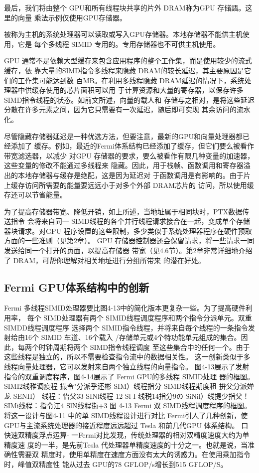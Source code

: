 最后，我们将由整个 GPU和所有线程块共享的片外 DRAM称为GPU 存储語。这里的向量
乘法示例仅使用GPU存储器。

被称为主机的系统处理器可以读取或写入GPU存储器。本地存储器不能供主机使用，它是
每个多线程 SIMID 专用的。专用存储器也不可供主机使用。

GPU 通常不是依赖大型缓存来包含应用程序的整个工作集，而是使用较少的流式缓存，依
靠大量的SIMD指令多线程来隐藏 DRAM的较长延迟，其主要原因是它们的工作集可能达到数
百MB。在利用多线程隐藏 DRAM延迟的情况下，系统处理器中供缓存使用的芯片面积可以用
于计算资源和大量的寄存器，以保存许多SIMD指令线程的状态。如前文所述，向量的载人和
存储与之相对，是将这些延迟分散在许多元素之间，因为它只需要有一次延迟，随后即可实现
其余访问的流水化。

尽管隐藏存储器延迟是一种优选方法，但要注意，最新的GPU和向量处理器都已经添加了
缓存。例如，最近的Fermi体系结构已经添加了缓存，但它们要么被看作带宽滤选器，以减少
对GPU 存储器的要求，要么被看作有限几种变量的加速器，这些变量的修改不能通过多线程来
隐藏。因此，用于栈帧、函数调用和寄存器溢出的本地存储器与缓存是绝配，这是因为延迟对
于函数调用是有影响的。由于片上缓存访问所需要的能量要远远小于对多个外部 DRAM芯片的
访问，所以使用缓存还可以节省能量。

为了提高存储器带宽、降低开销，如上所述，当地址属于相同块时，PTX数据传送指令
会将来自同一 SIMD线程的各个并行线程请求接合在一起，变成单个存储器块请求。对GPU
程序设置的这些限制，多少类似于系统处理器程序在硬件预取方面的一些准则（见第2章）。
GPU 存储器控制器还会保留请求，将一些请求一同发送给同一个打开的页面，以提高存储器
带宽（见4.6节）。第2章非常详细地介绍了 DRAM，可帮你理解对相关地址进行分组所带来
的潜在好处。

\subsection{Fermi GPU体系结构中的创新}
Fermi 多线程SIMID处理器要比图4-13中的简化版本更复杂一些。为了提高硬件利用率，
每个 SIMD处理器有两个 SIMID线程调度程序和两个指令分派单元。双重 SIMDD线程调度程序
选择两个 SIMID指令线程，并将来自每个线程的一条指令发射给由16个 SIMID 车道、16个载入
/存储单元或4个特功能单元组成的集合。因此，每两个时钟周期将两个 SIMD指令线程调度
至这些集合中的任何一个。由于这些线程是独立的，所以不需要检查指令流中的数据相关性。
这一创新类似于多线程向量处理器，它可以发射来自两个独立线程的向量指令。
图4-13展示了发射指令的双重调度程序，图4-14展示了 Fermi GPU的多线程 SIMID处理
器的框图。
SIMI2线稚调疫程
撮令"分派乎还彬
SIM）线程指分
SIMD线程期度租
拚父分派婵龙
SENII） 线程：怡父33
SINl线程
12
Sl I 线税14指分9の
SiNil）线提少指父！
SIMi线程：指令江4
SlN线程街+3
图 4-13 Fermi 双 SIMD线程调度程序的框图。将这一设计与图4-11 中的单 SIMD线程设计进行对比
Fermi引人了几种创新，使GPU与主流系统处理器的接近程度远远超过 Tesla 和前几代GPU
体系结构。
口 快速双精度浮点运算-
一Fermi对比发现，传统处理器的相对双精度速度大约为单精度速
度的一半，是先前Tesla 代处理器单精度速度的十分之一。也就是说，当准确性需要双
精度时，使用单精度在速度方面没有太大的诱惑力。在使用乘加指令时，峰值双精度性
能从过去 GPU的78 GFLOP/s增长到515 GFLOP/S。

